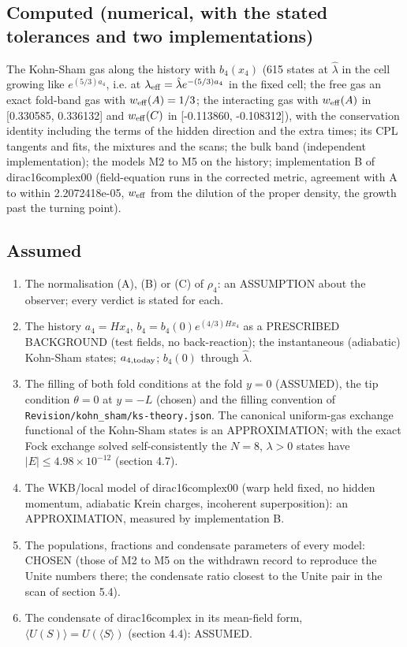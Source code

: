 \documentclass[11pt]{article}
\begin{document}
\subsection{Computed (numerical, with the stated tolerances and two implementations)}

The Kohn-Sham gas along the history with $b_4(x_4)$ (615 states at $\hat\lambda$ in the cell growing like $e^{(5/3)a_4}$, i.e. at $\lambda_{\rm eff} = \hat\lambda e^{-(5/3)a_4}$ in the fixed cell; the free gas an exact fold-band gas with $w_{\rm eff}(A) = 1/3$; the interacting gas with $w_{\rm eff}(A)$ in [0.330585, 0.336132] and $w_{\rm eff}(C)$ in [-0.113860, -0.108312]), with the conservation identity including the terms of the hidden direction and the extra times; its CPL tangents and fits, the mixtures and the scans; the bulk band (independent implementation); the models M2 to M5 on the history; implementation B of dirac16complex00 (field-equation runs in the corrected metric, agreement with A to within 2.2072418e-05, $w_{\rm eff}$ from the dilution of the proper density, the growth past the turning point).

\subsection{Assumed}

\begin{enumerate}
\item The normalisation (A), (B) or (C) of $\rho_4$: an ASSUMPTION about the observer; every verdict is stated for each.
\item The history $a_4 = Hx_4$, $b_4 = b_4(0)e^{(4/3)Hx_4}$ as a PRESCRIBED BACKGROUND (test fields, no back-reaction); the instantaneous (adiabatic) Kohn-Sham states; $a_{4,\rm today}$; $b_4(0)$ through $\hat\lambda$.
\item The filling of both fold conditions at the fold $y = 0$ (ASSUMED), the tip condition $\theta = 0$ at $y = -L$ (chosen) and the filling convention of \texttt{Revision\allowbreak{}/kohn\_sh\allowbreak{}am/ks-th\allowbreak{}eory.jso\allowbreak{}n}. The canonical uniform-gas exchange functional of the Kohn-Sham states is an APPROXIMATION; with the exact Fock exchange solved self-consistently the $N = 8$, $\lambda > 0$ states have $\lvert E\rvert \leq 4.98 \times 10^{-12}$ (section 4.7).
\item The WKB/local model of dirac16complex00 (warp held fixed, no hidden momentum, adiabatic Krein charges, incoherent superposition): an APPROXIMATION, measured by implementation B.
\item The populations, fractions and condensate parameters of every model: CHOSEN (those of M2 to M5 on the withdrawn record to reproduce the Unite numbers there; the condensate ratio closest to the Unite pair in the scan of section 5.4).
\item The condensate of dirac16complex in its mean-field form, $\langle U(S)\rangle = U(\langle S\rangle)$ (section 4.4): ASSUMED.
\end{enumerate}
\end{document}
